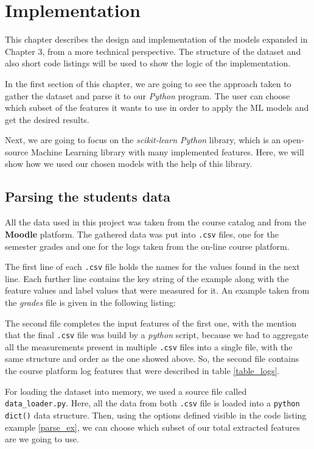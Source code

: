 \chapter{Implementation}

This chapter describes the design and implementation of the models expanded in 
Chapter 3, from a more technical perspective. The structure of the dataset and 
also short code listings will be used to show the logic of the implementation. 

In the first section of this chapter, 
we are going to see the approach taken to gather the dataset and parse it to our 
{\it Python} program. The user can choose which subset of the features it wants 
to use in order to apply the ML models and get the desired results.

Next, we are going to focus on the {\it scikit-learn Python} library, which is 
an open-source Machine Learning library with many implemented features. Here, 
we will show how we used our chosen models with the help of this library.  

\section{Parsing the students data}

All the data used in this project was taken from the course catalog and from 
the {\bf Moodle} platform. The gathered data was put into \texttt{.csv} files, 
one for the semester grades and one for the logs taken from the on-line course 
platform. 

The first line of each \texttt{.csv} file holds the names for the values found in 
the next line. Each further line contains the key string of the example along 
with the feature values and label values that were measured for it. An example 
taken from the {\it grades} file is given in the following listing: 



The second file completes the input features of the first one, with the mention that the 
final \texttt{.csv} file was build by a {\it python} script, because we had to 
aggregate all the measurements present in multiple \texttt{.csv} files into 
a single file, with the same structure and order as the one showed above. So, the 
second file contains the course platform log features that were described in table 
\ref{table_logs}.

For loading the dataset into memory, we used a source file called 
\texttt{data\_loader.py}. Here, all the data from both \texttt{.csv} file is loaded 
into a \texttt{python dict()} data structure. Then, using the options defined visible in 
the code listing example \ref{parse_ex}, we can choose which subset of our total extracted 
features are we going to use. 

